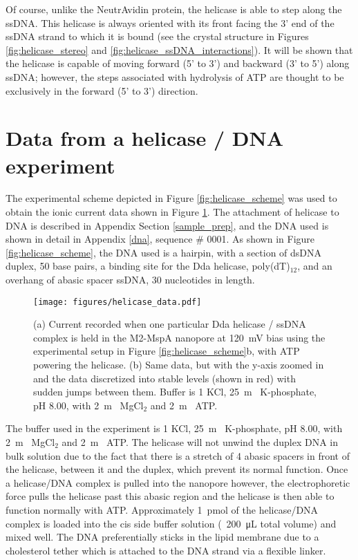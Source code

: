 Of course, unlike the NeutrAvidin protein, the helicase is able to step along the ssDNA.  This helicase is always oriented with its front facing the 3’ end of the ssDNA strand to which it is bound (see the crystal structure in Figures \ref{fig:helicase_stereo} and \ref{fig:helicase_ssDNA_interactions}).  It will be shown that the helicase is capable of moving forward (5’ to 3’) and backward (3’ to 5’) along ssDNA; however, the steps associated with hydrolysis of ATP are thought to be exclusively in the forward (5’ to 3’) direction.

\section{Data from a helicase / DNA experiment}

The experimental scheme depicted in Figure \ref{fig:helicase_scheme} was used to obtain the ionic current data shown in Figure \ref{fig:helicase_data}.  The attachment of helicase to DNA is described in Appendix Section \ref{sample_prep}, and the DNA used is shown in detail in Appendix \ref{dna}, sequence \# 0001.  As shown in Figure \ref{fig:helicase_scheme}, the DNA used is a hairpin, with a section of dsDNA duplex, \num{50} base pairs, a binding site for the Dda helicase, poly(dT)$_12$, and an overhang of abasic spacer ssDNA, \num{30} nucleotides in length.

\begin{figure}[H]
\begin{centering}
\texttt{[image: figures/helicase\_data.pdf]}
\caption[Data for helicase stepping along DNA]{(a) Current recorded when one particular Dda helicase / ssDNA complex is held in the M2-MspA nanopore at \SI{120}{\mV} bias using the experimental setup in Figure \ref{fig:helicase_scheme}b, with ATP powering the helicase.  (b) Same data, but with the y-axis zoomed in and the data discretized into stable levels (shown in red) with sudden jumps between them.  Buffer is \SI{1}{\Molar} KCl, \SI{25}{\m\Molar} K-phosphate, pH \num{8.00}, with \SI{2}{\m\Molar} MgCl$_2$ and \SI{2}{\m\Molar} ATP.}
\label{fig:helicase_data}
\end{centering}
\end{figure}

The buffer used in the experiment is \SI{1}{\Molar} KCl, \SI{25}{\m\Molar} K-phosphate, pH \num{8.00}, with \SI{2}{\m\Molar} MgCl$_2$ and \SI{2}{\m\Molar} ATP.  The helicase will not unwind the duplex DNA in bulk solution due to the fact that there is a stretch of \num{4} abasic spacers in front of the helicase, between it and the duplex, which prevent its normal function.  Once a helicase/DNA complex is pulled into the nanopore however, the electrophoretic force pulls the helicase past this abasic region and the helicase is then able to function normally with ATP.  Approximately \SI{1}{\pico\mol} of the helicase/DNA complex is loaded into the cis side buffer solution (~\SI{200}{\micro\liter} total volume) and mixed well.  The DNA preferentially sticks in the lipid membrane due to a cholesterol tether which is attached to the DNA strand via a flexible linker.

